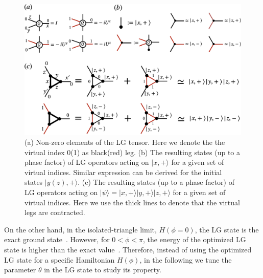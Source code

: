 \documentclass{ntuthesis}
\newcommand{\citep}{\cite}
\begin{document}
\begin{figure}[tb]
\centering
\includegraphics[width=\linewidth]{LG_star_tnsr}
\caption{(a) Non-zero elements of the LG tensor. Here we denote the the virtual index 0(1) as black(red) leg. (b) The resulting states (up to a phase factor) of LG operators acting on $|x,+\rangle$ for a given set of virtual indices. Similar expression can be derived for the initial states $|y(z), +\rangle$.  (c) The resulting states (up to a phase factor) of LG operators acting on $|\psi\rangle=|x,+\rangle |y,+\rangle |z,+\rangle$ for a given set of virtual indices. Here we use the thick lines to denote that the virtual legs are contracted.} 
\label{fig:LG_star_tnsr}
\end{figure}


 

On the other hand, in the isolated-triangle limit, $H(\phi=0)$, the LG state is the exact ground state~\citep{non-AbelianTO_2020,KSL_perturbative}.
%
%
However, for $0<\phi<\pi$, the energy of the optimized  LG state is higher than the exact value~\cite{non-AbelianTO_2020,Hong_Ya_2007}. 
%
Therefore, instead of using  the optimized LG state for  a specific Hamiltonian $H(\phi)$, in the following we tune the parameter $\theta$ in the  LG state to study its property. 
\end{document}
